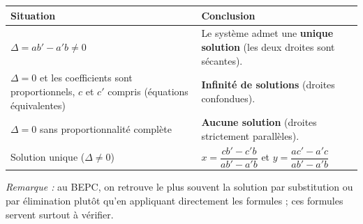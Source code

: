 \documentclass[11pt]{article}
\begin{document}
\begin{aretenir}
\begin{center}
\begin{tabularx}{\linewidth}{|l|X|}
\hline
\rowcolor{popblueL} \textbf{Situation} & \textbf{Conclusion} \\
\hline
$\Delta = ab'-a'b \neq 0$ & Le système admet une \textbf{unique solution} (les deux droites sont sécantes). \\
\hline
$\Delta = 0$ et les coefficients sont proportionnels, $c$ et $c'$ compris (équations équivalentes) & \textbf{Infinité de solutions} (droites confondues). \\
\hline
$\Delta = 0$ sans proportionnalité complète & \textbf{Aucune solution} (droites strictement parallèles). \\
\hline
Solution unique ($\Delta\neq 0$) & $x=\dfrac{cb'-c'b}{ab'-a'b}$ et $y=\dfrac{ac'-a'c}{ab'-a'b}$ \\
\hline
\end{tabularx}
\end{center}
\emph{Remarque :} au BEPC, on retrouve le plus souvent la solution par substitution ou par élimination plutôt qu'en appliquant directement les formules ; ces formules servent surtout à vérifier.
\end{aretenir}
\end{document}
